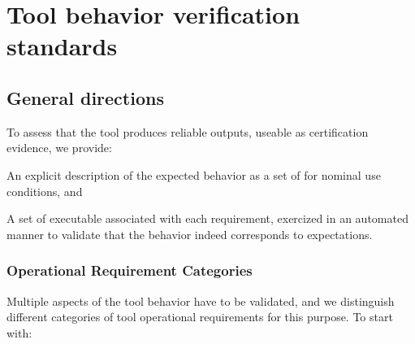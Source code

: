 \documentclass {report}
\begin{document}
\chapter{Tool behavior verification standards}

\section{General directions}

To assess that the tool produces reliable outputs, useable as certification
evidence, we provide:

\begin{Itemize}
\item%
  An explicit description of the expected behavior as a set of  for nominal use conditions, and
\item%
  A set of executable  associated with each requirement,
  exercized in an automated manner to validate that the behavior indeed
  corresponds to expectations.
\end{Itemize}

\subsection{Operational Requirement Categories}

Multiple aspects of the tool behavior have to be validated, and we distinguish
different categories of tool operational requirements for this purpose.
%
To start with:
\end{document}
